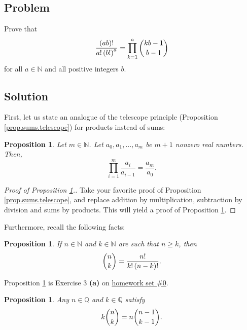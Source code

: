 \documentclass[paper=a4, fontsize=12pt]{scrartcl}%
\let\prodnonlimits\prod
\renewcommand{\prod}{\prodnonlimits\limits}
\theoremstyle{plainsl}
\newtheorem{proposition}[theorem]{Proposition}
\theoremstyle{definition}
\theoremstyle{remark}
\begin{document}
\subsection{Problem}

Prove that
\[
\dfrac{\left(  ab \right)  !}{a! \left(  b! \right)  ^{a}} = \prod_{k=1}^{a}
\dbinom{kb-1}{b-1}
\]
for all $a \in\mathbb{N}$ and all positive integers $b$.

\subsection{Solution}

First, let us state an analogue of the telescope principle (Proposition
\ref{prop.sums.telescope}) for products instead of sums:

\begin{proposition}
\label{prop.sums.telescope-prod}Let $m\in\mathbb{N}$. Let $a_{0},a_{1}%
,\ldots,a_{m}$ be $m+1$ nonzero real numbers. Then,
\[
\prod_{i=1}^{m}\dfrac{a_{i}}{a_{i-1}}=\dfrac{a_{m}}{a_{0}}.
\]

\end{proposition}

\begin{proof}
[Proof of Proposition \ref{prop.sums.telescope-prod}.] Take your favorite
proof of Proposition \ref{prop.sums.telescope}, and replace addition by
multiplication, subtraction by division and sums by products. This will yield
a proof of Proposition \ref{prop.sums.telescope-prod}.
\end{proof}


Furthermore, recall the following facts:

\begin{proposition}
\label{prop.sol.binom.102.fac-form}If $n\in\mathbb{N}$ and $k\in\mathbb{N}$
are such that $n\geq k$, then
\[
\dbinom{n}{k}=\dfrac{n!}{k!\left(  n-k\right)  !}.
\]

\end{proposition}

Proposition \ref{prop.sol.binom.102.fac-form} is Exercise 3 \textbf{(a)} on
\href{http://www-users.math.umn.edu/~dgrinber/19s/hw0s.pdf}{homework set \#0}.

\begin{proposition}
\label{prop.sol.binom.102.absorb}Any $n\in\mathbb{Q}$ and $k\in\mathbb{Q}$
satisfy
\[
k\dbinom{n}{k}=n\dbinom{n-1}{k-1}.
\]

\end{proposition}
\end{document}
